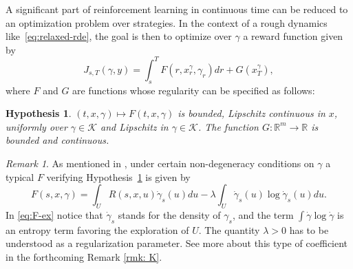 \documentclass[12pt,reqno]{amsart}
\numberwithin{equation}{section}  %
\newcommand{\1}{{\bf 1}}
\newcommand{\2}{{\bf 2}}
\newcommand{\ga}{\gamma}
\newcommand{\la}{\lambda}
\newtheorem{hypothesis}[theorem]{Hypothesis}
\theoremstyle{remark}
\newtheorem{remark}[theorem]{Remark}
\theoremstyle{remark}
\newcommand{\beq}{\begin{equation}}
\newcommand{\eeq}{\end{equation}}
\begin{document}
A significant part of reinforcement learning in continuous time can be reduced to an optimization problem over strategies. In the context of a rough dynamics like~\eqref{eq:relaxed-rde}, the goal is then to optimize over $\ga$ a reward function given by
\beq\label{eq:J}
J_{s,T} (\ga, y) = \int_s^T F(r, x_r^{\ga}, \ga_r) dr + G(x_T^{\ga}),
\eeq
where $F$ and $G$ are functions whose regularity can be specified as follows:
\begin{hypothesis}\label{hyp:reward}
	$(t,x,\gamma) \mapsto F(t,x,\gamma)$ is bounded, Lipschitz continuous in $x$, uniformly over $\gamma \in \mathcal K$ and Lipschitz in $\gamma \in \mathcal K$. The function $G:\mathbb R^m \to \mathbb R$ is bounded and continuous.
\end{hypothesis}

\begin{remark}\label{rmk: F}
As mentioned in \cite[Remark~4.3]{CHT}, under certain non-degeneracy conditions on $\ga$ a typical $F$ verifying Hypothesis~\ref{hyp:reward} is given by
\beq\label{eq:F-ex}
F(s,x,\ga) = \int_U R(s, x, u) \dot{\ga}_s(u) du - \la \int_U \dot{\ga}_s(u) \log \dot{\ga}_s(u) du.
\eeq
In \eqref{eq:F-ex} notice that $\dot{\ga}_s$ stands for the density of $\ga_s$, and the term $\int \dot{\ga} \log \dot{\ga}$ is an entropy term favoring the exploration of $U$. The quantity $\la > 0$ has to be understood as a regularization parameter. See more about this type of coefficient in the forthcoming Remark \ref{rmk: K}. 
\end{remark}
\end{document}
